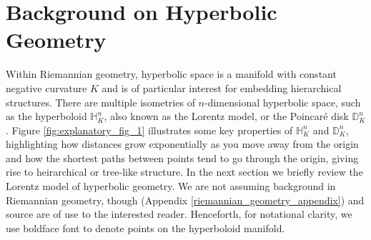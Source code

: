 \section{Background on Hyperbolic Geometry}\label{sec:background}

Within Riemannian geometry, hyperbolic space is a manifold with constant negative curvature $K$ and is of particular interest for embedding hierarchical structures. There are multiple isometries of $n$-dimensional hyperbolic space, such as the hyperboloid $\mathbb{H}_K^n$, also known as the Lorentz model, or the Poincar\'e disk $\mathbb{D}_K^n$. Figure \ref{fig:explanatory_fig_1} illustrates some key properties of $\mathbb{H}_K^n$ and $\mathbb{D}_K^n$, highlighting how distances grow exponentially as you move away from the origin and how the shortest paths between points tend to go through the origin, giving rise to heirarchical or tree-like structure. %
In the next section we briefly review the Lorentz model of hyperbolic geometry. We are not assuming background in Riemannian geometry, though (Appendix \ref{riemannian_geometry_appendix}) and source \cite{Ratcliffe94} are of use to the interested reader. Henceforth, for notational clarity, we use boldface font to denote points on the hyperboloid manifold.



